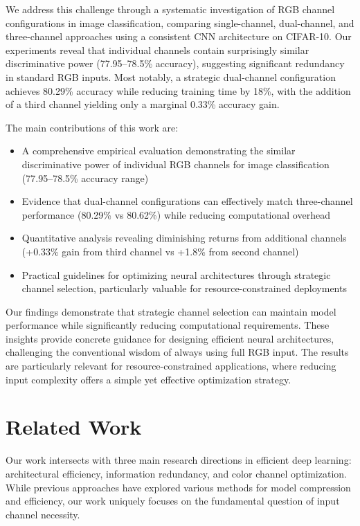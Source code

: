 \documentclass{article} %
\begin{document}
We address this challenge through a systematic investigation of RGB channel configurations in image classification, comparing single-channel, dual-channel, and three-channel approaches using a consistent CNN architecture on CIFAR-10. Our experiments reveal that individual channels contain surprisingly similar discriminative power (77.95--78.5\% accuracy), suggesting significant redundancy in standard RGB inputs. Most notably, a strategic dual-channel configuration achieves 80.29\% accuracy while reducing training time by 18\%, with the addition of a third channel yielding only a marginal 0.33\% accuracy gain.

The main contributions of this work are:
\begin{itemize}
    \item A comprehensive empirical evaluation demonstrating the similar discriminative power of individual RGB channels for image classification (77.95--78.5\% accuracy range)
    \item Evidence that dual-channel configurations can effectively match three-channel performance (80.29\% vs 80.62\%) while reducing computational overhead
    \item Quantitative analysis revealing diminishing returns from additional channels (+0.33\% gain from third channel vs +1.8\% from second channel)
    \item Practical guidelines for optimizing neural architectures through strategic channel selection, particularly valuable for resource-constrained deployments
\end{itemize}

Our findings demonstrate that strategic channel selection can maintain model performance while significantly reducing computational requirements. These insights provide concrete guidance for designing efficient neural architectures, challenging the conventional wisdom of always using full RGB input. The results are particularly relevant for resource-constrained applications, where reducing input complexity offers a simple yet effective optimization strategy.

\section{Related Work}
\label{sec:related}

Our work intersects with three main research directions in efficient deep learning: architectural efficiency, information redundancy, and color channel optimization. While previous approaches have explored various methods for model compression and efficiency, our work uniquely focuses on the fundamental question of input channel necessity.
\end{document}

